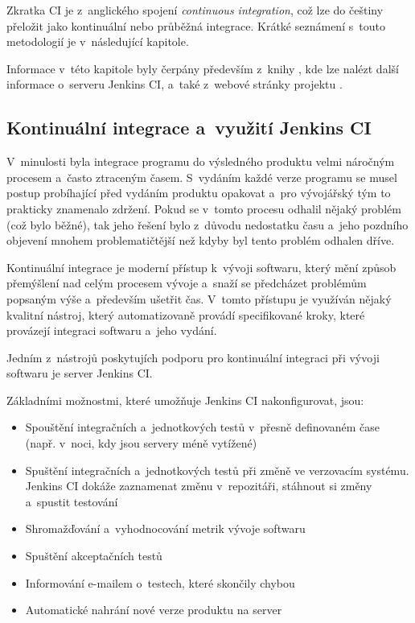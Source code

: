         Zkratka CI je z~anglického spojení \emph{continuous integration}, což lze do češtiny přeložit jako kontinuální nebo průběžná 
        integrace. Krátké seznámení s~touto metodologií je v~následující kapitole.

        Informace v~této kapitole byly čerpány především  z~knihy \cite{jenkinsBook}, kde lze nalézt další informace o~serveru Jenkins CI,
        a~také z~webové stránky projektu \cite{jenkinsWeb}.

        \subsection{Kontinuální integrace a~využití Jenkins CI}
            V~minulosti byla integrace programu do výsledného produktu velmi náročným procesem a~často ztraceným časem.
            S~vydáním každé verze programu se musel postup probíhající před vydáním produktu opakovat a~pro vývojářský tým
            to prakticky znamenalo zdržení. Pokud se v~tomto procesu odhalil nějaký problém (což bylo běžné),
            tak jeho řešení bylo z~důvodu nedostatku času a~jeho pozdního objevení mnohem problematičtější
            než kdyby byl tento problém odhalen dříve.

            Kontinuální integrace je moderní přístup k~vývoji softwaru, který mění způsob přemýšlení nad celým procesem vývoje
            a~snaží se předcházet problémům popsaným výše a~především ušetřit čas. V~tomto přístupu je využíván nějaký
            kvalitní nástroj, který automatizovaně provádí specifikované kroky, které provázejí integraci softwaru a~jeho vydání.

            Jedním z~nástrojů poskytujích podporu pro kontinuální integraci při vývoji softwaru je 
            server Jenkins CI. 
            
            \medskip \noindent Základními možnostmi, které umožňuje Jenkins CI nakonfigurovat, jsou:
            
            \begin{itemize}
                \item Spouštění integračních a~jednotkových testů v~přesně definovaném čase (např. v~noci, kdy jsou servery méně vytížené)
                \item Spuštění integračních a~jednotkových testů při změně ve verzovacím systému. Jenkins CI dokáže zaznamenat změnu v~repozitáři,
                    stáhnout si změny a~spustit testování
                \item Shromažďování a~vyhodnocování metrik vývoje softwaru
                \item Spuštění akceptačních testů
                \item Informování e-mailem o~testech, které skončily chybou
                \item Automatické nahrání nové verze produktu na server
            \end{itemize} 


